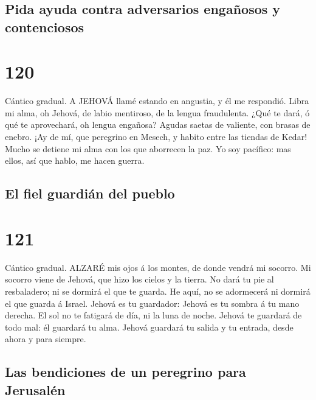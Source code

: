 \hypertarget{pida-ayuda-contra-adversarios-engauxf1osos-y-contenciosos}{%
\subsection{Pida ayuda contra adversarios engañosos y
contenciosos}\label{pida-ayuda-contra-adversarios-engauxf1osos-y-contenciosos}}

\hypertarget{section-119}{%
\section{120}\label{section-119}}

 Cántico gradual. A JEHOVÁ llamé estando en angustia, y él
me respondió.  Libra mi alma, oh Jehová, de labio mentiroso,
de la lengua fraudulenta.  ¿Qué te dará, ó qué te
aprovechará, oh lengua engañosa?  Agudas saetas de valiente,
con brasas de enebro.  ¡Ay de mí, que peregrino en Mesech, y
habito entre las tiendas de Kedar!  Mucho se detiene mi alma
con los que aborrecen la paz.  Yo soy pacífico: mas ellos,
así que hablo, me hacen guerra.

\hypertarget{el-fiel-guardiuxe1n-del-pueblo}{%
\subsection{El fiel guardián del
pueblo}\label{el-fiel-guardiuxe1n-del-pueblo}}

\hypertarget{section-120}{%
\section{121}\label{section-120}}

 Cántico gradual. ALZARÉ mis ojos á los montes, de donde
vendrá mi socorro.  Mi socorro viene de Jehová, que hizo los
cielos y la tierra.  No dará tu pie al resbaladero; ni se
dormirá el que te guarda.  He aquí, no se adormecerá ni
dormirá el que guarda á Israel.  Jehová es tu guardador:
Jehová es tu sombra á tu mano derecha.  El sol no te
fatigará de día, ni la luna de noche.  Jehová te guardará de
todo mal: él guardará tu alma.  Jehová guardará tu salida y
tu entrada, desde ahora y para siempre.

\hypertarget{las-bendiciones-de-un-peregrino-para-jerusaluxe9n}{%
\subsection{Las bendiciones de un peregrino para
Jerusalén}\label{las-bendiciones-de-un-peregrino-para-jerusaluxe9n}}


